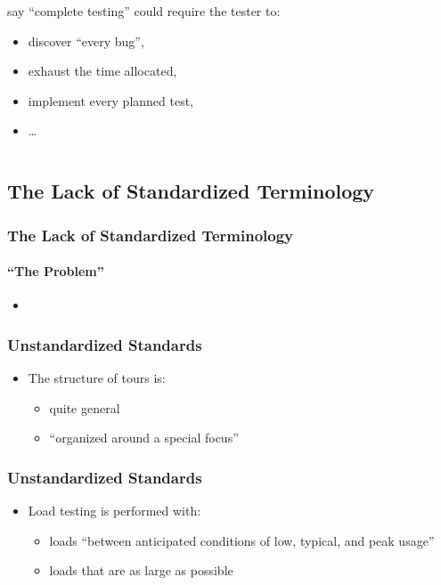 \documentclass{beamer}
\newcommand{\citepISTQB}{\citepalias[\citeyear{ISTQB}]{ISTQB}}
\begin{document}
\begin{frame}
\begin{columns}[T]
\begin{column}
            \citet[p.~7]{KanerEtAl2011} say ``complete testing'' could require
            the tester to:
            \begin{itemize}
                \item discover ``every bug'',
                \item exhaust the time allocated,
                \item implement every planned test,
                \item \dots{}
            \end{itemize}
        \end{column}
    \end{columns}
\end{frame}

\subsection{The Lack of Standardized Terminology}

\begin{frame}
    \frametitle{The Lack of Standardized Terminology}
    \framesubtitle{``The Problem''}
    \begin{itemize}
        \item \badTaxonomies{}
    \end{itemize}
\end{frame}

\begin{frame}
    \frametitle{Unstandardized Standards}
    \begin{itemize}
        \item The structure of tours is:
              \begin{itemize}
                  \item quite general \citep[p.~34]{IEEE2022}
                  \item<2-> ``organized around a special focus'' \citepISTQB{}
              \end{itemize}
    \end{itemize}
\end{frame}

\begin{frame}
    \frametitle{Unstandardized Standards}
    \begin{itemize}
        \item Load testing is performed with:
              \begin{itemize}
                  \item loads
                        ``between anticipated conditions of low, typical, and
                        peak usage'' \citep[p.~5]{IEEE2022}
                  \item<2-> loads that are as large as possible \citep[p.~86]{Patton2006}
              \end{itemize}
    \end{itemize}
\end{frame}
\end{document}
